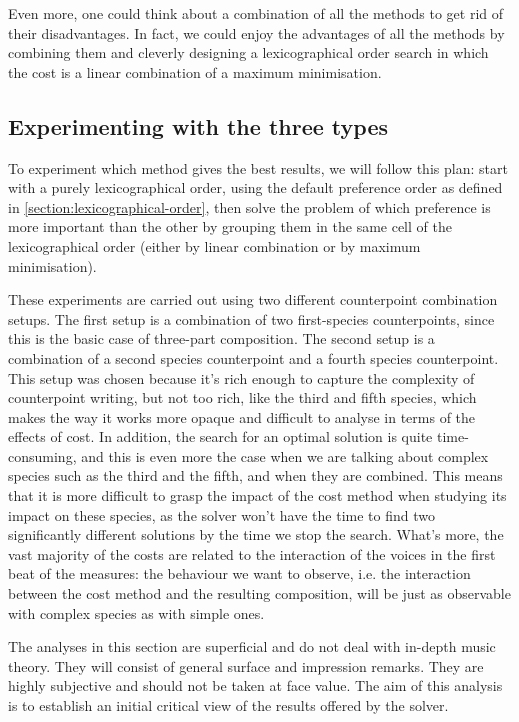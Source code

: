 Even more, one could think about a combination of all the methods to get rid of their disadvantages. In fact, we could enjoy the advantages of all the methods by combining them and cleverly designing a lexicographical order search in which the cost is a linear combination of a maximum minimisation.

\subsection{Experimenting with the three types}
To experiment which method gives the best results, we will follow this plan: start with a purely lexicographical order, using the default preference order as defined in \ref{section:lexicographical-order}, then solve the problem of which preference is more important than the other by grouping them in the same cell of the lexicographical order (either by linear combination or by maximum minimisation).


These experiments are carried out using two different counterpoint combination setups. The first setup is a combination of two first-species counterpoints, since this is the basic case of three-part composition. The second setup is a combination of a second species counterpoint and a fourth species counterpoint. This setup was chosen because it's rich enough to capture the complexity of counterpoint writing, but not too rich, like the third and fifth species, which makes the way it works more opaque and difficult to analyse in terms of the effects of cost. In addition, the search for an optimal solution is quite time-consuming, and this is even more the case when we are talking about complex species such as the third and the fifth, and when they are combined. This means that it is more difficult to grasp the impact of the cost method when studying its impact on these species, as the solver won't have the time to find two significantly different solutions by the time we stop the search. What's more, the vast majority of the costs are related to the interaction of the voices in the first beat of the measures: the behaviour we want to observe, i.e. the interaction between the cost method and the resulting composition, will be just as observable with complex species as with simple ones.

The analyses in this section are superficial and do not deal with in-depth music theory. They will consist of general surface and impression remarks. They are highly subjective and should not be taken at face value. The aim of this analysis is to establish an initial critical view of the results offered by the solver.

